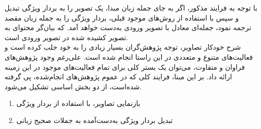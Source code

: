 با توجه به فرایند مذکور، اگر به جای جمله زبان مبدا، یک تصویر را به بردار ویژگی تبدیل و سپس با استفاده از روش‌های موجود قبلی، بردار ویژگی را به جمله زبان مقصد ترجمه نمود، جمله‌ای معادل با تصویر ورودی به‌دست خواهد آمد. که بیان‌گر محتوای به تصویر کشیده شده در تصویر ورودی است.
\\
شرح خودکار تصاویر، توجه پژوهش‌گران بسیار زیادی را به خود جلب کرده است و فعالیت‌های متنوع و متعددی در این راستا انجام شده است. علی‌رغم وجود پژوهش‌‌های فراوان و متفاوت، می‌توان یک بستر کلی برای تمام فعالیت‌های موجود در این زمینه ارائه داد. بر این مبنا، فرایند کلی که در عموم پژوهش‌های انجام‌شده، پی گرفته شده‌است، از دو بخش اساسی تشکیل می‌شود.
\begin{enumerate}
\item بازنمایی تصاویر، با استفاده از بردار ویژگی
\item تبدیل بردار ويژگی به‌دست‌آمده به جملات صحیح زبانی
\end{enumerate}



